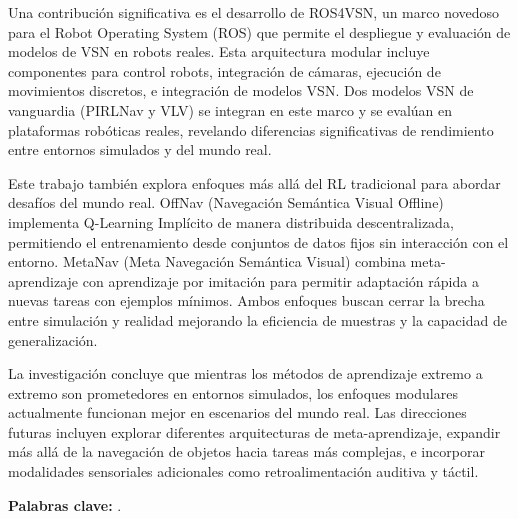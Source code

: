 Una contribución significativa es el desarrollo de ROS4VSN, un marco novedoso para el Robot Operating System (ROS) que permite el despliegue y evaluación de modelos de VSN en robots reales.
Esta arquitectura modular incluye componentes para control robots, integración de cámaras, ejecución de movimientos discretos, e integración de modelos VSN.
Dos modelos VSN de vanguardia (PIRLNav y VLV) se integran en este marco y se evalúan en plataformas robóticas reales, revelando diferencias significativas de rendimiento entre entornos simulados y del mundo real.

Este trabajo también explora enfoques más allá del RL tradicional para abordar desafíos del mundo real.
OffNav (Navegación Semántica Visual Offline) implementa Q-Learning Implícito de manera distribuida descentralizada, permitiendo el entrenamiento desde conjuntos de datos fijos sin interacción con el entorno.
MetaNav (Meta Navegación Semántica Visual) combina meta-aprendizaje con aprendizaje por imitación para permitir adaptación rápida a nuevas tareas con ejemplos mínimos.
Ambos enfoques buscan cerrar la brecha entre simulación y realidad mejorando la eficiencia de muestras y la capacidad de generalización.

La investigación concluye que mientras los métodos de aprendizaje extremo a extremo son prometedores en entornos simulados, los enfoques modulares actualmente funcionan mejor en escenarios del mundo real.
Las direcciones futuras incluyen explorar diferentes arquitecturas de meta-aprendizaje, expandir más allá de la navegación de objetos hacia tareas más complejas, e incorporar modalidades sensoriales adicionales como retroalimentación auditiva y táctil.

\textbf{Palabras clave:} \myThesisKeywords.



